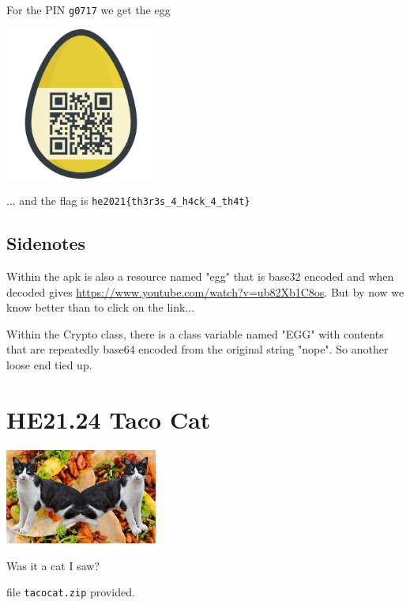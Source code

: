 \documentclass[english,a4paper,nols,noindent]{tufte-handout}
\begin{document}

For the PIN \verb+g0717+ we get the egg 
\begin{marginfigure}
    \includegraphics[width=50mm]{ch23/solution23.png}
\end{marginfigure}

... and the flag is \verb+he2021{th3r3s_4_h4ck_4_th4t}+

\subsection{Sidenotes}

Within the apk is also a resource named "egg" that is
base32 encoded and when decoded gives
\url{https://www.youtube.com/watch?v=ub82Xb1C8os}.  But by now we know better
than to click on the link...

Within the Crypto class, there is a class variable named "EGG" with contents
that are repeatedly base64 encoded from the original string "nope".  So another
loose end tied up.

\hypertarget{he21.24}{%
  \section{HE21.24 Taco Cat}
  \label{he21.24}}
\begin{marginfigure}
    \includegraphics[width=50mm]{images/challenge24.jpg}
\end{marginfigure}

\noindent Was it a cat I saw?

file \verb+tacocat.zip+ provided.
\end{document}

